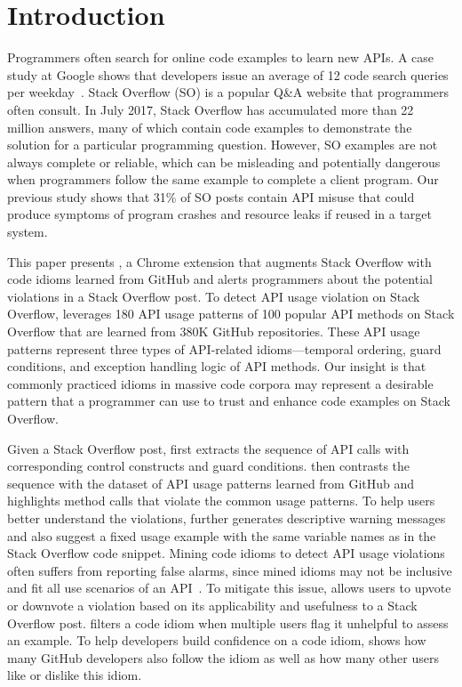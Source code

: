 \section{Introduction}
\label{sec:intro}
Programmers often search for online code examples to learn new APIs. A case study at Google shows that developers issue an average of 12 code search queries per weekday~\cite{sadowski2015developers}. Stack Overflow (SO) is a popular Q\&A website that programmers often consult. In July 2017, Stack Overflow has accumulated more than 22 million answers, many of which contain code examples to demonstrate the solution for a particular programming question. However, SO examples are not always complete or reliable, which can be misleading and potentially dangerous when programmers follow the same example to complete a client program. Our previous study shows that 31\% of SO posts contain API misuse that could produce symptoms of program crashes and resource leaks if reused in a target system. %

This paper presents {\tool}, a Chrome extension that augments Stack Overflow with code idioms learned from GitHub and alerts programmers about the potential violations in a Stack Overflow post. To detect API usage violation on Stack Overflow, {\tool} leverages 180 API usage patterns of 100 popular API methods on Stack Overflow that are learned from 380K GitHub repositories. These API usage patterns represent three types of API-related idioms---temporal ordering, guard conditions, and exception handling logic of API methods. Our insight is that commonly practiced idioms in massive code corpora may represent a desirable pattern that a programmer can use to trust and enhance code examples on Stack Overflow. 

Given a Stack Overflow post, {\tool} first extracts the sequence of API calls with corresponding control constructs and guard conditions. {\tool} then contrasts the sequence with the dataset of API usage patterns learned from GitHub and highlights method calls that violate the common usage patterns. To help users better understand the violations, {\tool} further generates descriptive warning messages and also suggest a fixed usage example with the same variable names as in the Stack Overflow code snippet. Mining code idioms to detect API usage violations often suffers from reporting false alarms, since mined idioms may not be inclusive and fit all use scenarios of an API~\cite{liang2016antminer}. To mitigate this issue, {\tool} allows users to upvote or downvote a violation based on its applicability and usefulness to a Stack Overflow post. {\tool} filters a code idiom when multiple users flag it unhelpful to assess an example. To help developers build confidence on a code idiom, {\tool} shows how many GitHub developers also follow the idiom as well as how many other users like or dislike this idiom.

